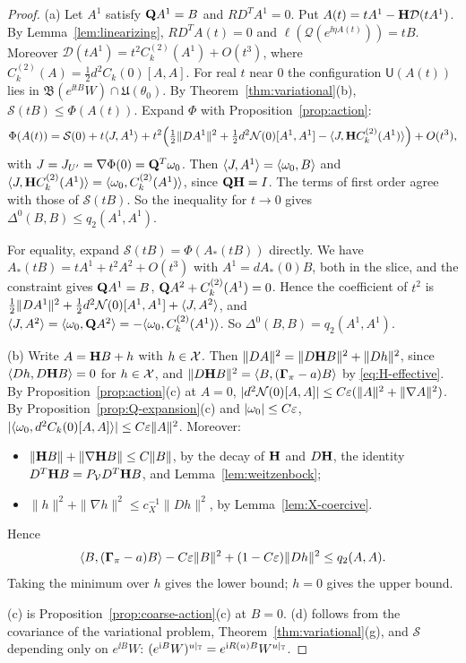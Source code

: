 \begin{proof}
(a) Let $A^1$ satisfy $\mathbf Q A^1=B$ and $RD^TA^1=0$. Put $A(t)=tA^1-\mathbf H\mathcal D(tA^1)$. By Lemma~\ref{lem:linearizing}, $RD^TA(t)=0$ and $\ell(\mathcal Q(e^{\ii\eta A(t)}))=tB$. Moreover $\mathcal D(tA^1)=t^2C^{(2)}_k(A^1)+O(t^3)$, where $C^{(2)}_k(A)=\frac12d^2C_k(0)[A,A]$. For real $t$ near $0$ the configuration $\mathsf U(A(t))$ lies in $\mathfrak B(e^{\ii tB}W)\cap\mathfrak U(\theta_0)$. By Theorem~\ref{thm:variational}(b), $\mathcal S(tB)\le\Phi(A(t))$. Expand $\Phi$ with Proposition~\ref{prop:action}:
\[
\Phi(A(t))=\mathcal S(0)+t\langle J,A^1\rangle+t^2\Big(\tfrac12\|DA^1\|^2+\tfrac12d^2\mathcal N(0)[A^1,A^1]-\langle J,\mathbf H C^{(2)}_k(A^1)\rangle\Big)+O(t^3),
\]
with $J=J_{U'}=\nabla\Phi(0)=\mathbf Q^T\omega_0$. Then $\langle J,A^1\rangle=\langle \omega_0,B\rangle$ and $\langle J,\mathbf H C^{(2)}_k(A^1)\rangle=\langle \omega_0,C^{(2)}_k(A^1)\rangle$, since $\mathbf Q\mathbf H=I$. The terms of first order agree with those of $\mathcal S(tB)$. So the inequality for $t\to0$ gives $\Delta^0(B,B)\le q_2(A^1,A^1)$.

For equality, expand $\mathcal S(tB)=\Phi(A_*(tB))$ directly. We have $A_*(tB)=tA^1+t^2A^2+O(t^3)$ with $A^1=dA_*(0)B$, both in the slice, and the constraint gives $\mathbf Q A^1=B$, $\mathbf Q A^2+C^{(2)}_k(A^1)=0$. Hence the coefficient of $t^2$ is $\frac12\|DA^1\|^2+\frac12d^2\mathcal N(0)[A^1,A^1]+\langle J,A^2\rangle$, and $\langle J,A^2\rangle=\langle \omega_0,\mathbf Q A^2\rangle=-\langle \omega_0,C^{(2)}_k(A^1)\rangle$. So $\Delta^0(B,B)=q_2(A^1,A^1)$.

(b) Write $A=\mathbf H B+h$ with $h\in\mathcal X$. Then $\|DA\|^2=\|D\mathbf H B\|^2+\|Dh\|^2$, since $\langle Dh,D\mathbf H B\rangle=0$ for $h\in\mathcal X$, and $\|D\mathbf H B\|^2=\langle B,(\boldsymbol\Gamma_\pi-a)B\rangle$ by \eqref{eq:H-effective}. By Proposition~\ref{prop:action}(c) at $A=0$, $|d^2\mathcal N(0)[A,A]|\le C\varepsilon(\|A\|^2+\|\nabla A\|^2)$. By Proposition~\ref{prop:Q-expansion}(c) and $|\omega_0|\le C\varepsilon$, $|\langle \omega_0,d^2C_k(0)[A,A]\rangle|\le C\varepsilon\|A\|^2$. Moreover:
\begin{itemize}
\item $\|\mathbf H B\|+\|\nabla\mathbf H B\|\le C\|B\|$, by the decay of $\mathbf H$ and $D\mathbf H$, the identity $D^T\mathbf H B=P_\mathcal V D^T\mathbf H B$, and Lemma~\ref{lem:weitzenbock};
\item $\|h\|^2+\|\nabla h\|^2\le c_X^{-1}\|Dh\|^2$, by Lemma~\ref{lem:X-coercive}.
\end{itemize}
Hence
\[
\langle B,(\boldsymbol\Gamma_\pi-a)B\rangle-C\varepsilon\|B\|^2+(1-C\varepsilon)\|Dh\|^2\le q_2(A,A).
\]
Taking the minimum over $h$ gives the lower bound; $h=0$ gives the upper bound.

(c) is Proposition~\ref{prop:coarse-action}(c) at $B=0$. (d) follows from the covariance of the variational problem, Theorem~\ref{thm:variational}(g), and $\mathcal S$ depending only on $e^{\ii B}W$: $(e^{\mathrm i B}W)^{u|_\mathbb T}=e^{\mathrm i R(u)B}W^{u|_\mathbb T}$.
\end{proof}

